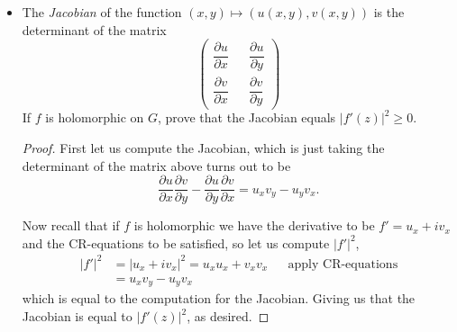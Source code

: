 \documentclass[11pt]{article}
\newenvironment{problem}[2][Problem\!]{\begin{trivlist}
\item[\hskip \labelsep {\bfseries #1}\hskip \labelsep {\bfseries #2}]}{\end{trivlist}}
\newcommand{\abs}[1]{\left\lvert#1\right\rvert} %
\newcommand{\pdiv}[2]{\dfrac{\partial #1}{\partial #2}}
\renewcommand{\geq}{\geqslant}
\begin{document}
\begin{problem}{4.2}
\begin{itemize}[itemsep=3em]
\begin{itemize}[itemsep=2em]
\item[(ii)] The \emph{Jacobian} of the function $(x,y) \mapsto (u(x,y),v(x,y))$ is the determinant of the matrix
\[\begin{pmatrix}
\dfrac{\partial u}{\partial x} && \dfrac{\partial u}{\partial y}\\[1.5em]
\dfrac{\partial v}{\partial x} && \dfrac{\partial v}{\partial y}
\end{pmatrix}\]
If $f$ is holomorphic on $G$, prove that the Jacobian equals $\abs{f'(z)}^2 \geq 0$.
\begin{proof}
  First let us compute the Jacobian, which is just taking the determinant of the matrix above turns out to be \[\pdiv{u}{x}\pdiv{v}{y} - \pdiv{u}{y}\pdiv{v}{x} = u_xv_y - u_yv_x.\]

  Now recall that if $f$ is holomorphic we have the derivative to be $f' = u_x + iv_x$ and the CR-equations to be satisfied, so let us compute $\abs{f'}^{2}$,
  \begin{align*}
    \abs{f'}^{2} &= \abs{u_x + iv_x}^{2} = u_{x}u_x + v_xv_x  && \text{apply CR-equations} \\
    &= u_xv_y -u_y v_x
  \end{align*}
  which is equal to the computation for the Jacobian. Giving us that the Jacobian is equal to $\abs{f'(z)}^{2}$, as desired.
\end{proof}

\end{itemize}
\end{itemize}
\end{problem}

\newpage  %
\end{document}
